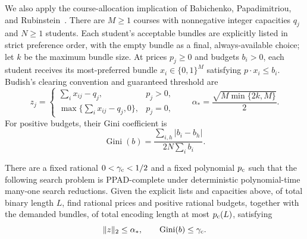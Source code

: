 We also apply the course-allocation implication of Babichenko,
Papadimitriou, and Rubinstein~\cite[Theorem~4 and Appendix~B]{BPR2016}.
There are $M\geq1$ courses with nonnegative integer capacities $q_j$
and $N\geq1$ students. Each student's acceptable bundles are explicitly
listed in strict preference order, with the empty bundle as a final,
always-available choice; let $k$ be the maximum bundle size.
At prices $p_j\geq0$ and budgets $b_i>0$, each student receives its
most-preferred bundle $x_i\in\{0,1\}^M$ satisfying $p\cdot x_i\leq b_i$.
Budish's clearing convention and guaranteed threshold are
\cite[Definition~1 and Theorem~1]{Budish2011}
\[
 z_j=\begin{cases}
 \sum_i x_{ij}-q_j,&p_j>0,\\
 \max\{\sum_i x_{ij}-q_j,0\},&p_j=0,
 \end{cases}
 \qquad
 \alpha_* = \frac{\sqrt{M\min\{2k,M\}}}{2}.
\]
For positive budgets, their Gini coefficient is
\[
 \operatorname{Gini}(b)
 =\frac{\sum_{i,h}|b_i-b_h|}{2N\sum_i b_i}.
\]

\begin{corollary}
\label{cor:course-allocation}
There are a fixed rational $0<\gamma_{\rm c}<1/2$ and a fixed
polynomial $p_{\rm c}$ such that the following search problem is
PPAD-complete under deterministic polynomial-time many-one search
reductions. Given the explicit lists and capacities above, of total
binary length $L$, find rational prices and positive rational budgets,
together with the demanded bundles, of total encoding length at most
$p_{\rm c}(L)$, satisfying
\[
 \lVert z\rVert_2\leq\alpha_*,\qquad
 \operatorname{Gini}(b)\leq\gamma_{\rm c}.
\]
\end{corollary}

